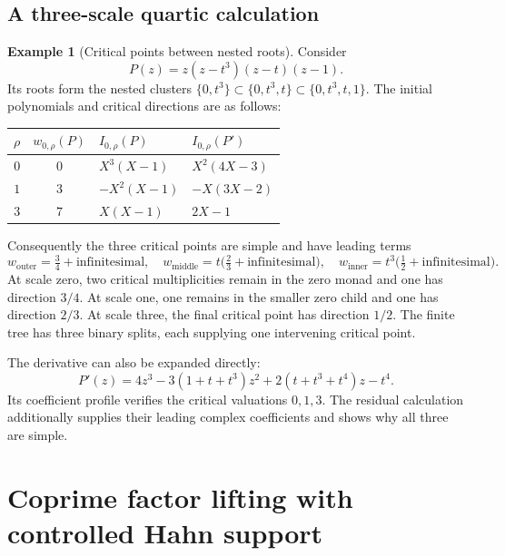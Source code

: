 \documentclass[11pt,letterpaper]{article}
\numberwithin{equation}{section}
\theoremstyle{definition}
\newtheorem{example}[theorem]{Example}
\theoremstyle{remark}\newtheorem{remark}[theorem]{Remark}
\begin{document}
\subsection{A three-scale quartic calculation}\label{subsec:nested}
\begin{example}[Critical points between nested roots]\label{ex:nested}
Consider
\[
 P(z)=z(z-t^3)(z-t)(z-1).
\]
Its roots form the nested clusters $\{0,t^3\}\subset\{0,t^3,t\}
\subset\{0,t^3,t,1\}$. The initial polynomials and critical directions
are as follows:
\begin{center}
\begin{tabular}{@{}ccll@{}}
\toprule
$\rho$ & $w_{0,\rho}(P)$ & $I_{0,\rho}(P)$ & $I_{0,\rho}(P')$\\
\midrule
$0$ & $0$ & $X^3(X-1)$ & $X^2(4X-3)$\\
$1$ & $3$ & $-X^2(X-1)$ & $-X(3X-2)$\\
$3$ & $7$ & $X(X-1)$ & $2X-1$\\
\bottomrule
\end{tabular}
\end{center}
Consequently the three critical points are simple and have leading terms
\begin{equation}\label{eq:nestedcritical}
 w_{\mathrm{outer}}=\tfrac34+\text{infinitesimal},\quad
 w_{\mathrm{middle}}=t\bigl(\tfrac23+\text{infinitesimal}\bigr),\quad
 w_{\mathrm{inner}}=t^3\bigl(\tfrac12+\text{infinitesimal}\bigr).
\end{equation}
At scale zero, two critical multiplicities remain in the zero monad
and one has direction $3/4$. At scale one, one remains in the smaller
zero child and one has direction $2/3$. At scale three, the final
critical point has direction $1/2$. The finite tree has three binary
splits, each supplying one intervening critical point.

The derivative can also be expanded directly:
\[
 P'(z)=4z^3-3(1+t+t^3)z^2+2(t+t^3+t^4)z-t^4.
\]
Its coefficient profile verifies the critical valuations $0,1,3$.
The residual calculation additionally supplies their leading complex
coefficients and shows why all three are simple.
\end{example}

\section{Coprime factor lifting with controlled Hahn support}\label{sec:hensel}
\end{document}

